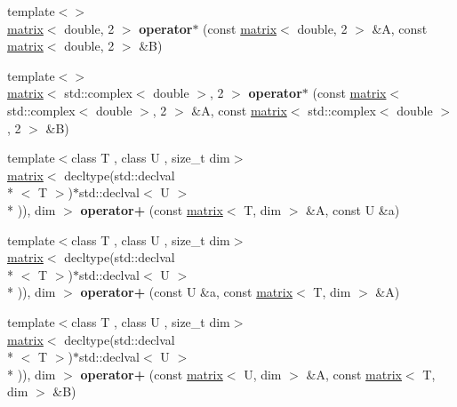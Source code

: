 \begin{DoxyCompactItemize}
\item 
\hypertarget{namespacekeycpp_ac5bd4a5eaf1cc853b600559127289823}{{\footnotesize template$<$$>$ }\\\hyperlink{classkeycpp_1_1matrix}{matrix}$<$ double, 2 $>$ {\bfseries operator$\ast$} (const \hyperlink{classkeycpp_1_1matrix}{matrix}$<$ double, 2 $>$ \&A, const \hyperlink{classkeycpp_1_1matrix}{matrix}$<$ double, 2 $>$ \&B)}\label{namespacekeycpp_ac5bd4a5eaf1cc853b600559127289823}

\item 
\hypertarget{namespacekeycpp_a0310594af20ccc687c25aef068f4cd6d}{{\footnotesize template$<$$>$ }\\\hyperlink{classkeycpp_1_1matrix}{matrix}$<$ std\-::complex$<$ double $>$, 2 $>$ {\bfseries operator$\ast$} (const \hyperlink{classkeycpp_1_1matrix}{matrix}$<$ std\-::complex$<$ double $>$, 2 $>$ \&A, const \hyperlink{classkeycpp_1_1matrix}{matrix}$<$ std\-::complex$<$ double $>$, 2 $>$ \&B)}\label{namespacekeycpp_a0310594af20ccc687c25aef068f4cd6d}

\item 
\hypertarget{namespacekeycpp_adb8866924fddc4057262b0ab42615437}{{\footnotesize template$<$class T , class U , size\-\_\-t dim$>$ }\\\hyperlink{classkeycpp_1_1matrix}{matrix}$<$ decltype(std\-::declval\\*
$<$ T $>$)$\ast$std\-::declval$<$ U $>$\\*
)), dim $>$ {\bfseries operator+} (const \hyperlink{classkeycpp_1_1matrix}{matrix}$<$ T, dim $>$ \&A, const U \&a)}\label{namespacekeycpp_adb8866924fddc4057262b0ab42615437}

\item 
\hypertarget{namespacekeycpp_a8ef9376f867b7683d5bf79a13f052f75}{{\footnotesize template$<$class T , class U , size\-\_\-t dim$>$ }\\\hyperlink{classkeycpp_1_1matrix}{matrix}$<$ decltype(std\-::declval\\*
$<$ T $>$)$\ast$std\-::declval$<$ U $>$\\*
)), dim $>$ {\bfseries operator+} (const U \&a, const \hyperlink{classkeycpp_1_1matrix}{matrix}$<$ T, dim $>$ \&A)}\label{namespacekeycpp_a8ef9376f867b7683d5bf79a13f052f75}

\item 
\hypertarget{namespacekeycpp_a1de1c62b34a2e4e23329683b4cb338f9}{{\footnotesize template$<$class T , class U , size\-\_\-t dim$>$ }\\\hyperlink{classkeycpp_1_1matrix}{matrix}$<$ decltype(std\-::declval\\*
$<$ T $>$)$\ast$std\-::declval$<$ U $>$\\*
)), dim $>$ {\bfseries operator+} (const \hyperlink{classkeycpp_1_1matrix}{matrix}$<$ U, dim $>$ \&A, const \hyperlink{classkeycpp_1_1matrix}{matrix}$<$ T, dim $>$ \&B)}\label{namespacekeycpp_a1de1c62b34a2e4e23329683b4cb338f9}


\end{DoxyCompactItemize}
